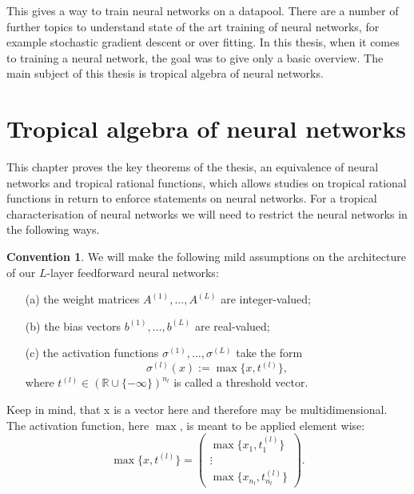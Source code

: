 \documentclass{article}
\theoremstyle{definition}
\newtheorem{remark}[theorem]{Remark}
\newtheorem{convention}[theorem]{Convention}
\begin{document}

This gives a way to train neural networks on a datapool. There are a number of further topics to understand state of the art training of neural networks, for example stochastic gradient descent or over fitting. In this thesis, when it comes to training a neural network, the goal was to give only a basic overview. The main subject of this thesis is tropical algebra of neural networks.
\newpage

\section{Tropical algebra of neural networks}\label{sec:trop_netw}

This chapter proves the key theorems of the thesis, an equivalence of neural networks and tropical rational functions, which allows studies on tropical rational functions in return to enforce statements on neural networks. For a tropical characterisation of neural networks we will need to restrict the neural networks in the following ways.

\begin{convention}\cite{zhang2018tropical}
We will make the following mild assumptions
on the architecture of our $L$-layer feedforward neural networks:
\begin{itemize}
\item[(a)]
the weight matrices $A^{(1)} , \dots , A^{(L)}$ are integer-valued;
\item[(b)]
the bias vectors $b^{(1)} , \dots , b^{(L)}$ are real-valued;
\item[(c)]
the activation functions $\sigma^{(1)} , \dots , \sigma^{(L)}$ take the form
$$\sigma^{(l)}(x) := \max\{x, t^{(l)}\},$$
where $t^{(l)} \in (\mathbb{R} \cup \{-\infty \})^{n_l}$ is called a threshold vector.
\end{itemize}
Keep in mind, that x is a vector here and therefore may be multidimensional. The activation function, here $\max$, is meant to be applied element wise:
$$\max\{x, t^{(l)}\}=\begin{pmatrix}\max\{x_1, t^{(l)}_1 \}\\ \vdots \\ \max\{x_{n_l}, t^{(l)}_{n_l} \}\end{pmatrix}.$$
\end{convention}
\end{document}
